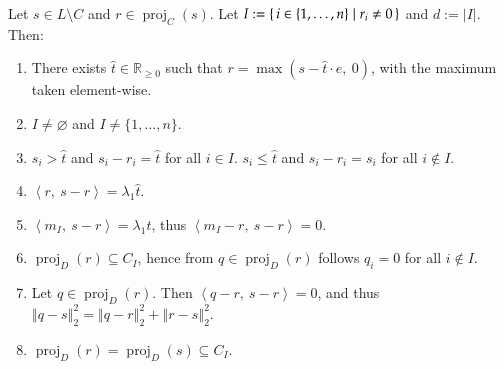 \documentclass[twoside,11pt]{article}
\DeclareMathOperator{\proj}{proj}
\newcommand{\R}{\mathbb{R}}
\newcommand{\0}{\mathcal{O}}
\newcommand{\norm}[1]{\left\Vert#1\right\Vert}
\newcommand{\abs}[1]{\left\vert #1 \right\vert}
\newcommand{\scp}[2]{\left<#1,\ #2\right>}
\newcommand{\discint}[2]{\{#1,\dotsc,#2\}}
\newcommand{\inint}[2]{\in\discint{#1}{#2}}
\renewcommand{\emptyset}{\varnothing}
\begin{document}
\begin{lemma}
\label{lem:splx}
Let $s\in L\setminus C$ and $r\in\proj_C(s)$.
Let $I := \set{i\inint{1}{n} | r_i\neq 0}$ and $d := \abs{I}$.
Then:
\begin{enumerate}
\item \label{lem:splx_a}
There exists $\hat{t}\in\R_{\geq 0}$ such that $r = \max\left(s - \hat{t}\cdot e,\ 0\right)$, with the maximum taken element-wise.

\item \label{lem:splx_b}
$I\neq \emptyset$ and $I \neq \discint{1}{n}$.

\item \label{lem:splx_c}
$s_i > \hat{t}$ and $s_i - r_i = \hat{t}$ for all $i\in I$.
$s_i \leq \hat{t}$ and $s_i - r_i = s_i$ for all $i\not\in I$.

\item \label{lem:splx_d}
$\scp{r}{s - r} = \lambda_1\hat{t}$.

\item \label{lem:splx_e}
$\scp{m_I}{s - r} = \lambda_1\hat{t}$, thus $\scp{m_I - r}{s - r} = 0$.

\item \label{lem:splx_f}
$\proj_D(r) \subseteq C_I$, hence from $q\in\proj_D(r)$ follows $q_i = 0$ for all $i\not\in I$.

\item \label{lem:splx_g}
Let $q\in\proj_D(r)$. Then $\scp{q - r}{s - r} = 0$, and thus $\norm{q - s}_2^2 = \norm{q - r}_2^2 + \norm{r - s}_2^2$.

\item \label{lem:splx_h}
$\proj_D(r) = \proj_D(s) \subseteq C_I$.
\end{enumerate}
\end{lemma}
\end{document}
